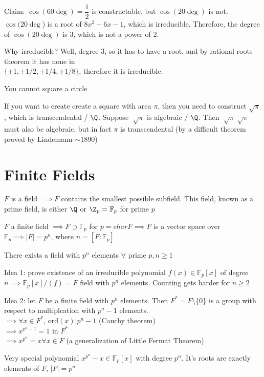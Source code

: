 \documentclass[10pt]{article}
\newcommand{\F}{\mathbb{F}}
\begin{document}
Claim: $\cos(60 \deg) = \dfrac{1}{2}$ is constructable, but $\cos(20\deg)$ is not. $\cos(20 \deg$) is a root of $8x^3 - 6x - 1$, which is irreducible. Therefore, the degree of $\cos(20\deg)$ is 3, which is not a power of 2.

Why irreducible? Well, degree 3, so it has to have a root, and by 
rational roots theorem it has none in\\
$\{\pm1, \pm 1/2, \pm 1/4, \pm 1/8\}$, therefore it is irreducible.

\begin{cor}
    You cannot square a circle
\end{cor}
If you want to create create a square with area $\pi$, then you need to construct $\sqrt{\pi}$, which is transcendental / $\Q$. Suppose $\sqrt[]{\pi}$ is algebraic / $\Q$. Then $\sqrt[]{\pi} \sqrt[]{\pi}$ must also be algebraic, but in fact $\pi$ is transcendental (by a difficult theorem proved by Lindemann $\sim1890$)

\section{Finite Fields}
$F$ is a field $\implies F$ contains the smallest possible subfield. This field, known as a prime field, is either $\Q$ or $\Z_p = \F_p$ for prime $p$

$F$ a finite field $\implies F \supset \F_p$ for $p = char F \implies F$ is a vector space over $\F_p \implies |F| = p^n$, where $n = [F: \F_p]$

\begin{thm}
    There exists a field with $p^n$ elements $\forall$ prime $p, n \geq 1$
\end{thm}
Idea 1: prove existence of an irreducible polynomial $f(x) \in \F_p[x]$ of degree $n \implies \F_p[x]/(f) = F$ field with $p^n$ elements. Counting gets harder for $n \geq 2$

Idea 2: let $F$ be a finite field with $p^n$ elements. Then $F^* = F\setminus\{0\}$ is a group with respect to multiplcation with $p^n - 1$ elements.\\
$\implies \forall x \in F^*$, ord$(x) | p^n - 1$ (Cauchy theorem)\\
$\implies x^{p^n - 1} = 1$ in $F^*$\\
$\implies x^{p^n} = x \forall x \in F$ (a generalization of Little Fermat Theorem)

Very special polynomial $x^{p^n} - x \in \F_p[x]$ with degree $p^n$. It's roots are exactly elements of $F$, $|F| = p^n$
\end{document}
